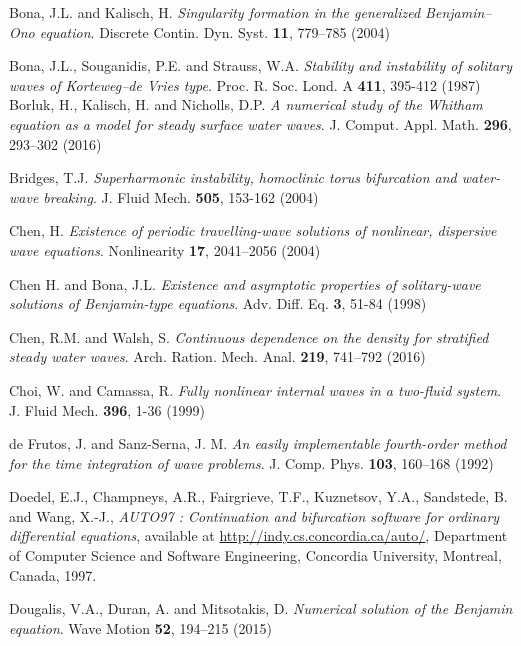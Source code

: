 \begin{thebibliography}{}
 Bona, J.L. and Kalisch, H.
              {\em Singularity formation in the generalized Benjamin--Ono equation}.
              Discrete Contin. Dyn. Syst. \textbf{11}, 779--785 (2004)


Bona, J.L., Souganidis, P.E. and Strauss, W.A.
{\em Stability and instability of solitary waves of Korteweg--de Vries type}.
Proc. R. Soc. Lond. A \textbf{411}, 395-412 (1987) 
%
%
 Borluk, H., Kalisch, H. and Nicholls, D.P. 
{\em A numerical study of the Whitham equation as a model for steady surface water waves}.
J. Comput. Appl. Math. \textbf{296}, 293--302 (2016) 


Bridges, T.J. 
{\em Superharmonic instability, homoclinic torus bifurcation and water-wave breaking}.
J. Fluid Mech. \textbf{505}, 153-162 (2004)


 Chen, H.
{\em Existence of periodic travelling-wave solutions of nonlinear, dispersive wave equations}. 
Nonlinearity \textbf{17}, 2041--2056 (2004)


 Chen H. and Bona, J.L. 
          {\em Existence and asymptotic properties of solitary-wave
          solutions of Benjamin-type equations}.
          Adv. Diff. Eq. \textbf{3},  51-84 (1998)

%

 Chen, R.M. and Walsh, S. 
{\em Continuous dependence on the density for stratified steady water waves}.
Arch. Ration. Mech. Anal. \textbf{219}, 741--792 (2016)


 Choi, W. and Camassa, R.
          {\em Fully nonlinear internal waves in a two-fluid system}.
          J. Fluid Mech.  \textbf{396}, 1-36 (1999)

de Frutos, J. and Sanz-Serna, J. M.
{\em An easily implementable fourth-order method for the time integration of wave problems}.
J. Comp. Phys. \textbf{103}, 160--168 (1992)



Doedel, E.J., Champneys, A.R., Fairgrieve, T.F., Kuznetsov, Y.A., Sandstede, B. and Wang, X.-J., 
{\em AUTO97 : Continuation and bifurcation software for ordinary differential equations}, 
available at 
\url{http://indy.cs.concordia.ca/auto/}, Department of Computer Science and Software Engineering, Concordia University, Montreal, Canada, 1997. 


 Dougalis, V.A., Duran, A. and Mitsotakis, D. 
{\em Numerical solution of the Benjamin equation}.
Wave Motion \textbf{52}, 194--215 (2015)




\end{thebibliography}
